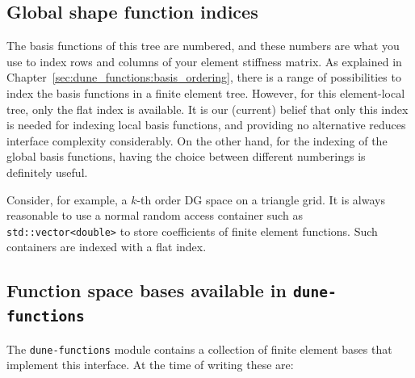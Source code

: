 \documentclass[a4paper,10pt,headings=normal,bibliography=totoc]{scrartcl}
\newcommand{\cpp}[1]{\lstinline[basicstyle=\ttfamily]!#1!}
\newcommand{\dunemodule}[1]{\texttt{#1}}
\begin{document}
\subsection{Global shape function indices}

The basis functions of this tree are numbered, and these numbers are what you use to index rows and columns
of your element stiffness matrix.  As explained in Chapter~\ref{sec:dune_functions:basis_ordering}, there is a range
of possibilities to index the basis functions in a finite element tree.  However, for this element-local
tree, only the flat index is available.  It is our (current) belief that only this
index is needed for indexing local basis functions, and providing no alternative reduces interface
complexity considerably.  On the other hand, for the indexing of the global basis functions, having the choice
between different numberings is definitely useful.

Consider, for example, a $k$-th order DG space on a triangle grid.  It is always reasonable to use a normal
random access container such as \cpp{std::vector<double>} to store coefficients of finite element functions.
Such containers are indexed with a flat index.


\subsection{Function space bases available in \texorpdfstring{\dunemodule{dune-functions}}{dune-functions}}

The \dunemodule{dune-functions} module contains a collection of finite element bases that implement
this interface.  At the time of writing these are:
\end{document}

